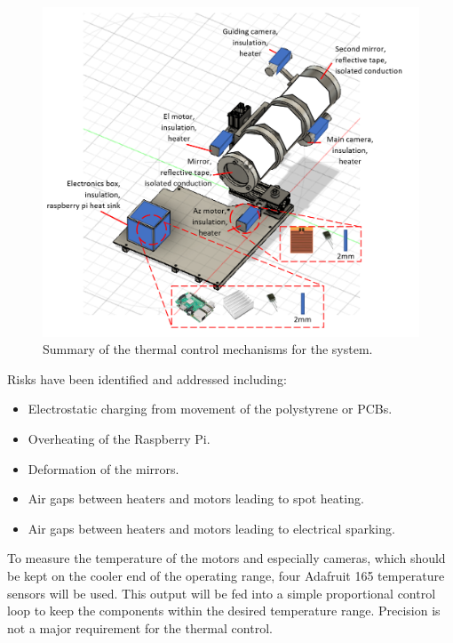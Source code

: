 \begin{figure}[H]
\centering
\includegraphics[scale=0.8]{4-experiment-design/img/mechanical/thermalsolutions.png}
\caption{Summary of the thermal control mechanisms for the system.}
\label{fig:thermalsolutions}
\end{figure}

Risks have been identified and addressed including:

\begin{itemize}
  \item Electrostatic charging from movement of the polystyrene or PCBs.
  \item Overheating of the Raspberry Pi.
  \item Deformation of the mirrors.
  \item Air gaps between heaters and motors leading to spot heating.
  \item Air gaps between heaters and motors leading to electrical sparking.

\end{itemize}

To measure the temperature of the motors and especially cameras, which should be kept on the cooler end of the operating range, four Adafruit 165 temperature sensors will be used. This output will be fed into a simple proportional control loop to keep the components within the desired temperature range. Precision is not a major requirement for the thermal control.

